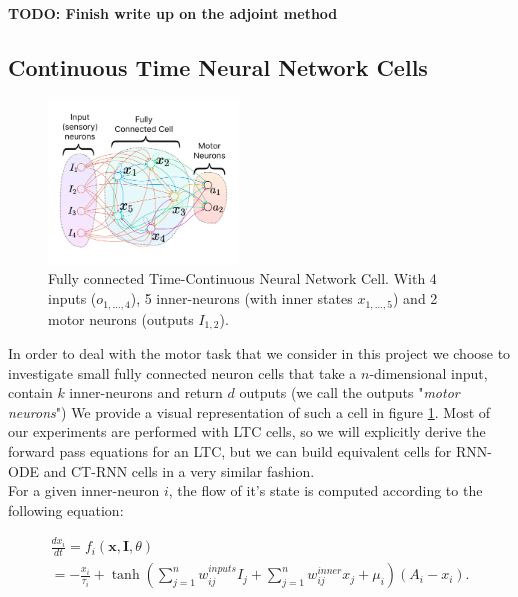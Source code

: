 \textbf{TODO: Finish write up on the adjoint method}

\subsection{Continuous Time Neural Network Cells}

\begin{figure}[h!]
    \centering
    \includegraphics[width=0.45\textwidth]{figures/LTC_Cell.pdf}
    \caption{Fully connected Time-Continuous Neural Network Cell. With 4 inputs ($o_{1,\dots,4}$), 5 inner-neurons (with inner states $x_{1,\dots,5}$) and 2 motor neurons (outputs $I_{1,2}$).}
    \label{fig:cell_drawing}
\end{figure}

In order to deal with the motor task that we consider in this project we choose to investigate small fully connected neuron cells that take a $n$-dimensional input, contain $k$ inner-neurons and return $d$ outputs (we call the outputs "\textit{motor neurons}") We provide a visual representation of such a cell in figure \ref{fig:cell_drawing}. Most of our experiments are performed with LTC cells, so we will explicitly derive the forward pass equations for an LTC, but we can build equivalent cells for RNN-ODE and CT-RNN cells in a very similar fashion.\\

For a given inner-neuron $i$, the flow of it's state is computed according to the following equation: 

\begin{footnotesize}
    \begin{align*}
        \frac{dx_i}{dt} = f_i(\textbf{x},\textbf{I},\theta)\\
        = - \frac{x_i}{\tau_i} +
        \tanh \left( \sum_{j=1}^{n} w_{ij}^\textit{inputs} I_j +\sum_{j=1}^{n} w_{ij}^\textit{inner} x_j  +\mu_i\right) (A_i-x_i).
    \end{align*}
\end{footnotesize}


